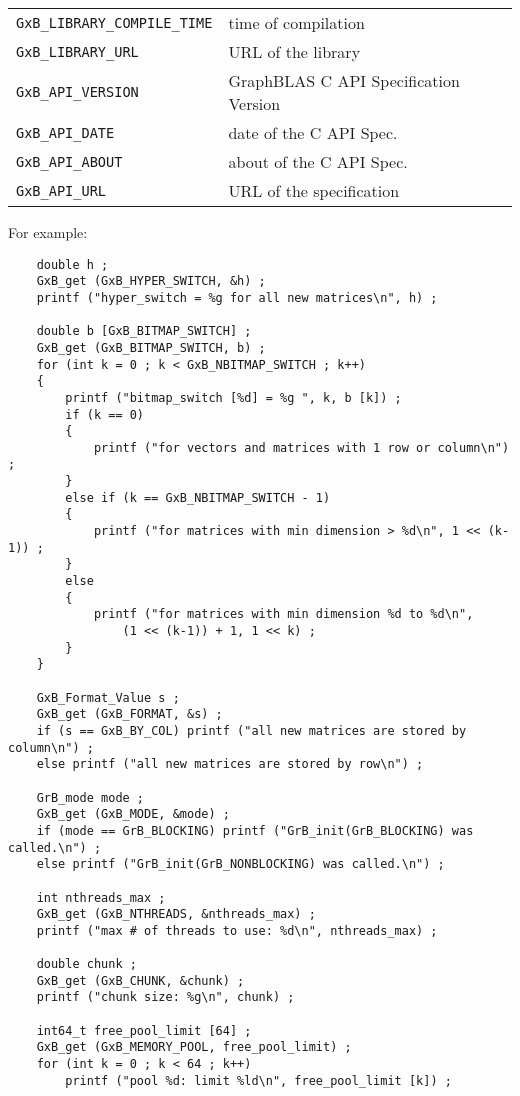 \documentclass[12pt]{article}
\begin{document}
{{\begin{tabular}{ll}
        \verb'GxB_LIBRARY_COMPILE_TIME' & time of compilation \\
        \verb'GxB_LIBRARY_URL'          & URL of the library \\
        \hline
        \verb'GxB_API_VERSION'  & GraphBLAS C API Specification Version \\
        \verb'GxB_API_DATE'     & date of the C API Spec.  \\
        \verb'GxB_API_ABOUT'    & about of the C API Spec. \\
        \verb'GxB_API_URL'      & URL of the specification \\
        \hline
\end{tabular}
}
\vspace{0.2in}

For example:

{\footnotesize
\begin{verbatim}
    double h ;
    GxB_get (GxB_HYPER_SWITCH, &h) ;
    printf ("hyper_switch = %g for all new matrices\n", h) ;

    double b [GxB_BITMAP_SWITCH] ;
    GxB_get (GxB_BITMAP_SWITCH, b) ;
    for (int k = 0 ; k < GxB_NBITMAP_SWITCH ; k++)
    {
        printf ("bitmap_switch [%d] = %g ", k, b [k]) ;
        if (k == 0)
        {
            printf ("for vectors and matrices with 1 row or column\n") ;
        }
        else if (k == GxB_NBITMAP_SWITCH - 1) 
        {
            printf ("for matrices with min dimension > %d\n", 1 << (k-1)) ;
        }
        else
        {
            printf ("for matrices with min dimension %d to %d\n",
                (1 << (k-1)) + 1, 1 << k) ;
        }
    }

    GxB_Format_Value s ;
    GxB_get (GxB_FORMAT, &s) ;
    if (s == GxB_BY_COL) printf ("all new matrices are stored by column\n") ;
    else printf ("all new matrices are stored by row\n") ;

    GrB_mode mode ;
    GxB_get (GxB_MODE, &mode) ;
    if (mode == GrB_BLOCKING) printf ("GrB_init(GrB_BLOCKING) was called.\n") ;
    else printf ("GrB_init(GrB_NONBLOCKING) was called.\n") ;

    int nthreads_max ;
    GxB_get (GxB_NTHREADS, &nthreads_max) ;
    printf ("max # of threads to use: %d\n", nthreads_max) ;

    double chunk ;
    GxB_get (GxB_CHUNK, &chunk) ;
    printf ("chunk size: %g\n", chunk) ;

    int64_t free_pool_limit [64] ;
    GxB_get (GxB_MEMORY_POOL, free_pool_limit) ;
    for (int k = 0 ; k < 64 ; k++)
        printf ("pool %d: limit %ld\n", free_pool_limit [k]) ;


\end{verbatim}}}
\end{document}
